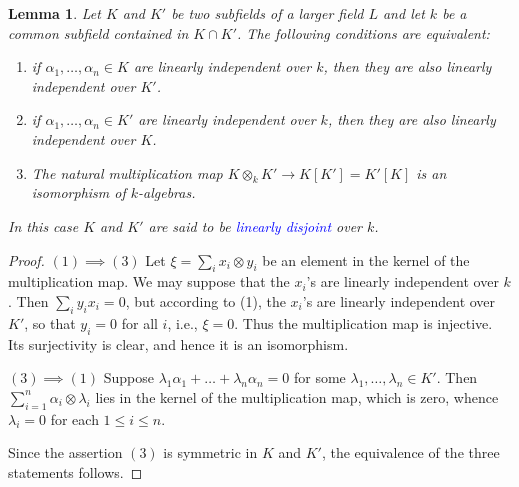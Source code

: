 \documentclass[10pt]{article}
\theoremstyle{thmstyle}
\newtheorem{lemma}[theorem]{Lemma}
\theoremstyle{defstyle}
\newcommand{\define}[1]{\textcolor{blue}{\textit{#1}}}
\renewcommand{\le}{\leqslant}
\begin{document}
\begin{lemma}
    Let $K$ and $K'$ be two subfields of a larger field $L$ and let $k$ be a common subfield contained in $K\cap K'$. The following conditions are equivalent: 
    \begin{enumerate}[label=(\arabic*)]
        \item if $\alpha_1,\dots,\alpha_n\in K$ are linearly independent over $k$, then they are also linearly independent over $K'$. 
        \item if $\alpha_1,\dots,\alpha_n\in K'$ are linearly independent over $k$, then they are also linearly independent over $K$. 
        \item The natural multiplication map $K\otimes_k K'\to K[K'] = K'[K]$ is an isomorphism of $k$-algebras.
    \end{enumerate}
    In this case $K$ and $K'$ are said to be \define{linearly disjoint} over $k$.
\end{lemma}
\begin{proof}
    $(1)\implies(3)$ Let $\xi = \sum_i x_i\otimes y_i$ be an element in the kernel of the multiplication map. We may suppose that the $x_i$'s are linearly independent over $k$. Then $\sum_i y_ix_i = 0$, but according to (1), the $x_i$'s are linearly independent over $K'$, so that $y_i = 0$ for all $i$, i.e., $\xi = 0$. Thus the multiplication map is injective. Its surjectivity is clear, and hence it is an isomorphism.

    $(3)\implies(1)$ Suppose $\lambda_1\alpha_1 + \dots + \lambda_n\alpha_n = 0$ for some $\lambda_1,\dots,\lambda_n\in K'$. Then $\sum_{i = 1}^n \alpha_i\otimes\lambda_i$ lies in the kernel of the multiplication map, which is zero, whence $\lambda_i = 0$ for each $1\le i\le n$.

    Since the assertion $(3)$ is symmetric in $K$ and $K'$, the equivalence of the three statements follows.
\end{proof}
\end{document}

